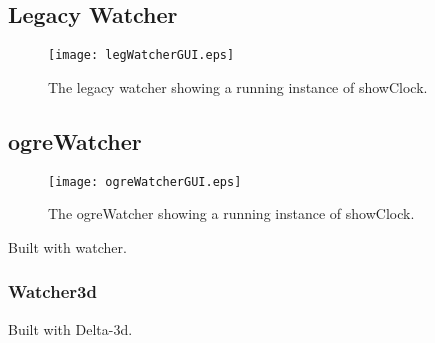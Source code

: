 \documentclass{article}
\begin{document}
\subsection{Legacy Watcher}
\begin{figure}
\centering
\texttt{[image: legWatcherGUI.eps]}
\caption{The legacy watcher showing a running instance of showClock.}
\end{figure}

\subsection{ogreWatcher}
\begin{figure}
\centering
\texttt{[image: ogreWatcherGUI.eps]}
\caption{The ogreWatcher showing a running instance of showClock.}
\end{figure}

Built with watcher.
\subsubsection{Watcher3d}
Built with Delta-3d.

\printindex
\end{document}
